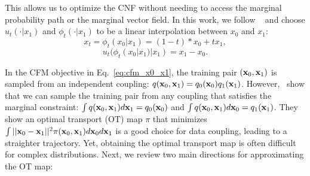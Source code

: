 This allows us to optimize the CNF without needing to access the marginal probability path or the marginal vector field.
In this work, we follow ~\cite{lipman2022flow} and choose $u_t(\cdot | x_1)$ and $\phi_t(\cdot | x_1)$ to be a linear interpolation between $x_0$ and $x_1$:
\begin{equation}
\label{eq:linear_flow}
x_t = \phi_t(x_0|x_1) = (1 -t) * x_0 + t x_1,
\end{equation}
\begin{equation}
u_t(\phi_t(x_0|x_1)|x_1) = x_1 - x_0.
\end{equation}
\fi




In the CFM objective in Eq.~\ref{eq:cfm_x0_x1}, the training pair $(
{\mathbf{x}}_0, {\mathbf{x}}_1)$ is sampled from an independent coupling: $q({\mathbf{x}}_0, {\mathbf{x}}_1) = q_0({\mathbf{x}}_0) q_1({\mathbf{x}}_1)$.
%
However,~\citet{tong2023improving,pooladian2023multisample} show that we can sample the training pair from any coupling that satisfies the marginal constraint: $\int q({\mathbf{x}}_0, {\mathbf{x}}_1) d{\mathbf{x}}_1 = q_0({\mathbf{x}}_0)$ and $\int q({\mathbf{x}}_0, {\mathbf{x}}_1) d{\mathbf{x}}_0 = q_1({\mathbf{x}}_1)$. 
%
%
They show an optimal transport (OT) map $\pi$ that minimizes $\int ||{\mathbf{x}}_0 - {\mathbf{x}}_1||^2 \pi({\mathbf{x}}_0,{\mathbf{x}}_1) d{\mathbf{x}}_0 d{\mathbf{x}}_1$ is a good choice for data coupling, leading to a straighter trajectory.
%
Yet, obtaining the optimal transport map is often difficult for complex distributions.
%
Next, we review two main directions for approximating the OT map:

